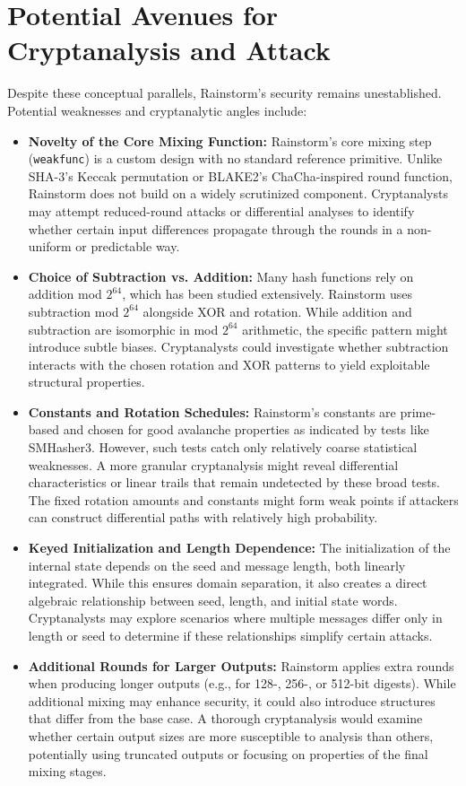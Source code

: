 \documentclass[11pt,a4paper]{article}
\begin{document}
\section*{Potential Avenues for Cryptanalysis and Attack}
Despite these conceptual parallels, Rainstorm’s security remains unestablished. Potential weaknesses and cryptanalytic angles include:

\begin{itemize}
  \item \textbf{Novelty of the Core Mixing Function:}  
  Rainstorm’s core mixing step (\texttt{weakfunc}) is a custom design with no standard reference primitive. Unlike SHA-3’s Keccak permutation or BLAKE2’s ChaCha-inspired round function, Rainstorm does not build on a widely scrutinized component. Cryptanalysts may attempt reduced-round attacks or differential analyses to identify whether certain input differences propagate through the rounds in a non-uniform or predictable way.

  \item \textbf{Choice of Subtraction vs. Addition:}  
  Many hash functions rely on addition mod $2^{64}$, which has been studied extensively. Rainstorm uses subtraction mod $2^{64}$ alongside XOR and rotation. While addition and subtraction are isomorphic in mod $2^{64}$ arithmetic, the specific pattern might introduce subtle biases. Cryptanalysts could investigate whether subtraction interacts with the chosen rotation and XOR patterns to yield exploitable structural properties.

  \item \textbf{Constants and Rotation Schedules:}  
  Rainstorm’s constants are prime-based and chosen for good avalanche properties as indicated by tests like SMHasher3. However, such tests catch only relatively coarse statistical weaknesses. A more granular cryptanalysis might reveal differential characteristics or linear trails that remain undetected by these broad tests. The fixed rotation amounts and constants might form weak points if attackers can construct differential paths with relatively high probability.

  \item \textbf{Keyed Initialization and Length Dependence:}  
  The initialization of the internal state depends on the seed and message length, both linearly integrated. While this ensures domain separation, it also creates a direct algebraic relationship between seed, length, and initial state words. Cryptanalysts may explore scenarios where multiple messages differ only in length or seed to determine if these relationships simplify certain attacks.

  \item \textbf{Additional Rounds for Larger Outputs:}  
  Rainstorm applies extra rounds when producing longer outputs (e.g., for 128-, 256-, or 512-bit digests). While additional mixing may enhance security, it could also introduce structures that differ from the base case. A thorough cryptanalysis would examine whether certain output sizes are more susceptible to analysis than others, potentially using truncated outputs or focusing on properties of the final mixing stages.

\end{itemize}
\end{document}

